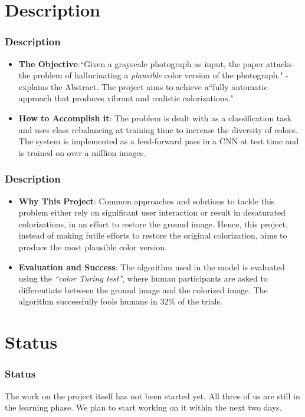 \documentclass[16pt, subsection=false]{beamer}
\begin{document}
\section{Description}
\begin{frame}
	\frametitle{Description}
	\begin{itemize}
		\item\textbf{The Objective}:``Given a grayscale photograph as input, the paper attacks the problem
			of hallucinating a \emph{plausible} color version of the photograph." - explains the Abstract.
			The project aims to achieve a``fully automatic approach that produces vibrant and realistic 
			colorizations."
		\item\textbf{How to Accomplish it}: The problem is dealt with as a classification task and uses class
			rebalancing at training time to increase the diversity of colors. The system is implemented as
			a feed-forward pass in a CNN at test time and is trained on over a million images.
	\end{itemize}
\end{frame}
\begin{frame}
	\frametitle{Description}
	\begin{itemize}
		\item\textbf{Why This Project}: Common approaches and solutions to tackle this problem either rely on
			significant user interaction or result in desaturated colorizations, in an effort to restore
			the ground image. Hence, this project, instead of making futile efforts to restore the
			original colorization, aims to produce the most plausible color version.
		\item\textbf{Evaluation and Success}: The algorithm used in the model is evaluated using the 
			\emph{``color Turing test"}, where human participants are asked to differentiate between the 
			ground image and the colorized image. The algorithm successfully fools humans in 32\% of the
			trials.
	\end{itemize}                                                                                                   \end{frame}

\section{Status}
\begin{frame}
	\frametitle{Status}
	The work on the project itself has not been started yet.
	All three of us are still in the learning phase.
	We plan to start working on it within the next two days.
\end{frame}
\end{document}
